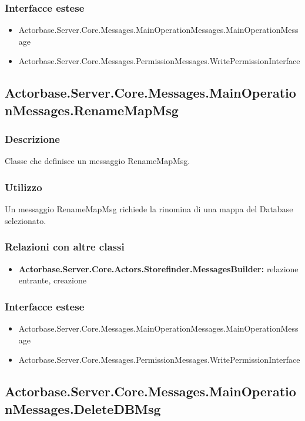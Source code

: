\documentclass[a4paper]{article}
\begin{document}
			\subsubsection{Interfacce estese}
			\begin{itemize}
				\item Actorbase.Server.Core.Messages.MainOperationMessages.MainOperationMessage
				\item Actorbase.Server.Core.Messages.PermissionMessages.WritePermissionInterface
			\end{itemize}

			\subsection{Actorbase.Server.Core.Messages.MainOperationMessages.RenameMapMsg}
			\subsubsection{Descrizione}
				Classe che definisce un messaggio RenameMapMsg.
			\subsubsection{Utilizzo}
				Un messaggio RenameMapMsg richiede la rinomina di una mappa del Database selezionato.
			\subsubsection{Relazioni con altre classi}
			\begin{itemize}
				\item \textbf{Actorbase.Server.Core.Actors.Storefinder.MessagesBuilder:} relazione entrante, creazione
			\end{itemize}
			\subsubsection{Interfacce estese}
			\begin{itemize}
				\item Actorbase.Server.Core.Messages.MainOperationMessages.MainOperationMessage
				\item Actorbase.Server.Core.Messages.PermissionMessages.WritePermissionInterface
			\end{itemize}

			\subsection{Actorbase.Server.Core.Messages.MainOperationMessages.DeleteDBMsg}
\end{document}

